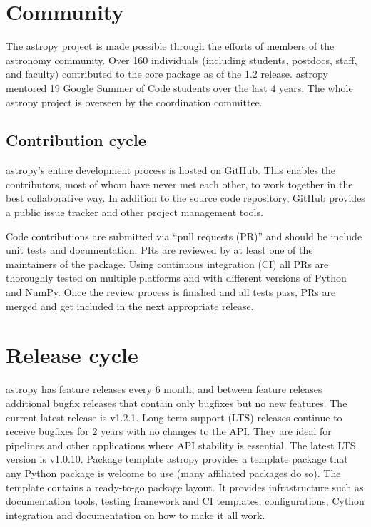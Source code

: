 \documentclass{iau}
\begin{document}
\section{Community}

The astropy project is made possible through the efforts of members of the
astronomy community. Over 160 individuals (including students, postdocs,
staff, and faculty) contributed to the core package as of the 1.2
release. astropy mentored 19 Google Summer of Code students over the last 4
years. The whole astropy project is overseen by the coordination committee.

\subsection{Contribution cycle}

astropy’s entire development process is hosted on GitHub. This enables the
contributors, most of whom have never met each other, to work together in
the best collaborative way. In addition to the source code repository,
GitHub provides a public issue tracker and other project management tools.

Code contributions are submitted via “pull requests (PR)” and should be
include unit tests and documentation. PRs are reviewed by at least one of
the maintainers of the package. Using continuous integration (CI) all PRs
are thoroughly tested on multiple platforms and with different versions of
Python and NumPy. Once the review process is finished and all tests pass,
PRs are merged and get included in the next appropriate release.


\section{Release cycle}

astropy has feature releases every 6 month, and between feature releases
additional bugfix releases that contain only bugfixes but no new
features. The current latest release is v1.2.1.  Long-term support (LTS)
releases continue to receive bugfixes for 2 years with no changes to the
API. They are ideal for pipelines and other applications where API stability
is essential. The latest LTS version is v1.0.10.  Package template astropy
provides a template package that any Python package is welcome to use (many
affiliated packages do so).  The template contains a ready-to-go package
layout. It provides infrastructure such as documentation tools, testing
framework and CI templates, configurations, Cython integration and
documentation on how to make it all work.
\end{document}
